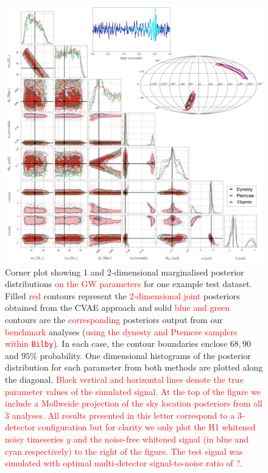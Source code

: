\documentclass[%
showpacs,
 amsmath,amssymb,
 aps,
 twocolumn,
 prl,
 reprint,
floatfix,
]{revtex4-1}
\newcommand{\new}[1]{\textcolor{red}{#1}}
\begin{document}
%
%
\begin{figure}
    \includegraphics[width=\textwidth]{corner_testcase0.png}
    \caption{\label{fig:corner_plot} Corner plot showing 1 and 2-dimensional
marginalised posterior distributions \new{on the \ac{GW} parameters} for one
example test dataset. Filled \new{red} contours represent the
\new{2-dimensional joint} posteriors obtained from the \ac{CVAE} approach and
solid \new{blue and green} contours are the \new{corresponding} posteriors
output from our \new{benchmark} analyses (\new{using the dynesty and Ptemcee
samplers within \texttt{Bilby}}). In each case, the contour boundaries enclose
$68,90$ and $95\%$ probability. One dimensional histograms of the posterior
distribution for each parameter from both methods are plotted along the
diagonal. \new{Black vertical and horizontal lines denote the true parameter
values of the simulated signal. At the top of the figure we include a Mollweide
projection of the sky location posteriors from all 3 analyses. All results
presented in this letter correspond to a 3-detector configuration but for
clarity we only plot the H1 whitened noisy timeseries $y$ and the noise-free
whitened signal (in blue and cyan respectively) to the right of the figure. The
test signal was simulated with optimal multi-detector signal-to-noise ratio of
?.}} 
\end{figure}
\end{document}
